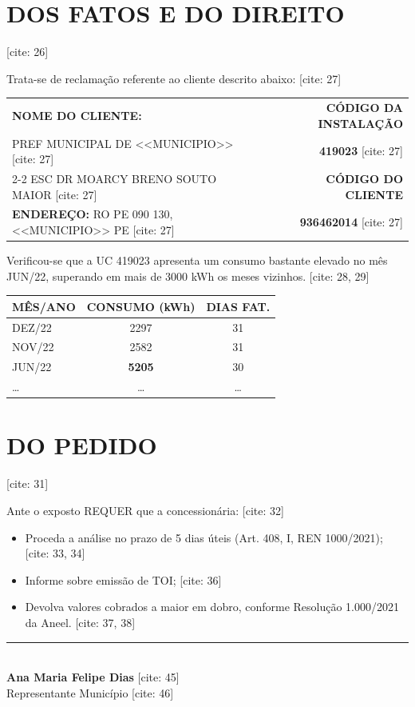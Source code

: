 \documentclass[12pt,a4paper]{article}
\begin{document}
\section*{DOS FATOS E DO DIREITO} [cite: 26]

Trata-se de reclamação referente ao cliente descrito abaixo: [cite: 27]

\vspace{0.5em}
\noindent
\begin{tabularx}{\textwidth}{|X|r|}
    \hline
    \textbf{NOME DO CLIENTE:} & \textbf{CÓDIGO DA INSTALAÇÃO} \\
    PREF MUNICIPAL DE <<MUNICIPIO>> [cite: 27] & \textbf{419023} [cite: 27] \\ \cline{2-2}
    ESC DR MOARCY BRENO SOUTO MAIOR [cite: 27] & \textbf{CÓDIGO DO CLIENTE} \\
    \textbf{ENDEREÇO:} RO PE 090 130, <<MUNICIPIO>> PE [cite: 27] & \textbf{936462014} [cite: 27] \\
    \hline
\end{tabularx}

\vspace{1em}
Verificou-se que a UC 419023 apresenta um consumo bastante elevado no mês JUN/22, superando em mais de 3000 kWh os meses vizinhos. [cite: 28, 29]

\begin{center}
\begin{tabular}{|l|c|c|}
    \hline
    \textbf{MÊS/ANO} & \textbf{CONSUMO (kWh)} & \textbf{DIAS FAT.} \\ \hline
    DEZ/22 & 2297 & 31 \\ \hline
    NOV/22 & 2582 & 31 \\ \hline
    JUN/22 & \textbf{5205} & 30 \\ \hline
    \dots & \dots & \dots \\ \hline
\end{tabular}
\end{center} 

\vspace{1em}

\section*{DO PEDIDO} [cite: 31]

Ante o exposto REQUER que a concessionária: [cite: 32]
\begin{itemize}[label=--, leftmargin=1.5cm]
    \item Proceda a análise no prazo de 5 dias úteis (Art. 408, I, REN 1000/2021); [cite: 33, 34]
    \item Informe sobre emissão de TOI; [cite: 36]
    \item Devolva valores cobrados a maior em dobro, conforme Resolução 1.000/2021 da Aneel. [cite: 37, 38]
\end{itemize}

\vspace{3em}

\begin{center}
    \rule{8cm}{0.5pt} \\
    \textbf{Ana Maria Felipe Dias} [cite: 45] \\
    Representante Município [cite: 46]
\end{center}
\end{document}
